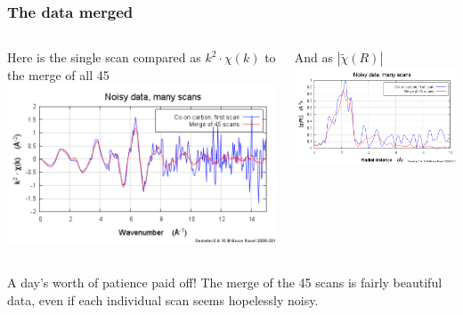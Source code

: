 \documentclass[10pt, xcolor=x11names, compress]{beamer}
\begin{document}
\begin{frame}
  \frametitle{The data merged}
  \begin{columns}[T]
    \begin{column}{0.5\linewidth}
      Here is the single scan compared as $k^2\cdot\chi(k)$ to the merge of all 45
      \includegraphics[width=\linewidth]{images/merge_chik.png}
    \end{column}
    \begin{column}{0.5\linewidth}
      \centering And as $|\tilde\chi(R)|$\\[2.5ex]
      \includegraphics[width=\linewidth]{images/merge_chir.png}
    \end{column}
  \end{columns}
  \begin{block}{}
    A day's worth of patience paid off!  The merge of the 45 scans is
    fairly beautiful data, even if each individual scan seems
    hopelessly noisy.
  \end{block}
\end{frame}
\end{document}

